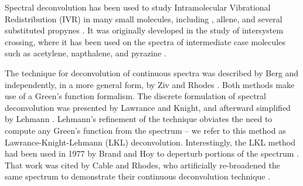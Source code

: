 Spectral deconvolution has been used to study Intramolecular
Vibrational Redistribution (IVR) in many small molecules, including
, allene, and several substituted propynes \cite{cable80,
  timmermans95, andrews98, hudspeth98}.  It was originally developed
in the study of intersystem crossing, where it has been used on the
spectra of intermediate case molecules such as acetylene, napthalene,
and pyrazine \cite{drabbels94, cable80, lawrance85}.

The technique for deconvolution of continuous spectra was described by
Berg and independently, in a more general form, by Ziv and Rhodes
\cite{berg76, ziv76}.  Both methods make use of a Green's function
formalism.  The discrete formulation of spectral deconvolution was
presented by Lawrance and Knight, and afterward simplified by Lehmann
\cite{lawrance85, lehmann91}.  Lehmann's refinement of the technique
obviates the need to compute any Green's function from the spectrum --
we refer to this method as Lawrance-Knight-Lehmann (LKL)
deconvolution.  Interestingly, the LKL method had been used in 1977 by
Brand and Hoy to deperturb portions of the  spectrum
\cite{brand77}.  That work was cited by Cable and Rhodes, who
artificially re-broadened the same spectrum to demonstrate their
continuous deconvolution technique \cite{cable80}.


